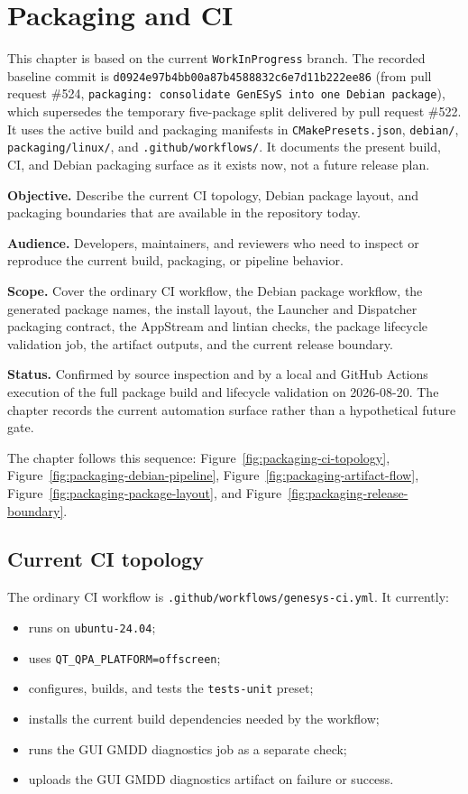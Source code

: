 \chapter{Packaging and CI}
\label{chap:packaging-and-ci}

This chapter is based on the current \texttt{WorkInProgress} branch.
The recorded baseline commit is \texttt{d0924e97b4bb00a87b4588832c6e7d11b222ee86}
(from pull request \#524, \texttt{packaging: consolidate GenESyS into one
Debian package}), which supersedes the temporary five-package split delivered
by pull request \#522.
It uses the active build and packaging manifests in
\texttt{CMakePresets.json}, \texttt{debian/}, \texttt{packaging/linux/}, and
\texttt{.github/workflows/}. It documents the present build, CI, and Debian
packaging surface as it exists now, not a future release plan.

\noindent\textbf{Objective.} Describe the current CI topology, Debian package
layout, and packaging boundaries that are available in the repository today.

\noindent\textbf{Audience.} Developers, maintainers, and reviewers who need to
inspect or reproduce the current build, packaging, or pipeline behavior.

\noindent\textbf{Scope.} Cover the ordinary CI workflow, the Debian package
workflow, the generated package names, the install layout, the Launcher and
Dispatcher packaging contract, the AppStream and lintian checks, the package
lifecycle validation job, the artifact outputs, and the current release
boundary.

\noindent\textbf{Status.} Confirmed by source inspection and by a local and
GitHub Actions execution of the full package build and lifecycle validation
on 2026-08-20. The chapter records the current automation surface rather than
a hypothetical future gate.

The chapter follows this sequence:
Figure~\ref{fig:packaging-ci-topology},
Figure~\ref{fig:packaging-debian-pipeline},
Figure~\ref{fig:packaging-artifact-flow},
Figure~\ref{fig:packaging-package-layout}, and
Figure~\ref{fig:packaging-release-boundary}.

\section{Current CI topology}
\label{sec:packaging-current-ci-topology}

The ordinary CI workflow is \texttt{.github/workflows/genesys-ci.yml}. It
currently:
\begin{itemize}
\item runs on \texttt{ubuntu-24.04};
\item uses \texttt{QT\_QPA\_PLATFORM=offscreen};
\item configures, builds, and tests the \texttt{tests-unit} preset;
\item installs the current build dependencies needed by the workflow;
\item runs the GUI GMDD diagnostics job as a separate check;
\item uploads the GUI GMDD diagnostics artifact on failure or success.
\end{itemize}


